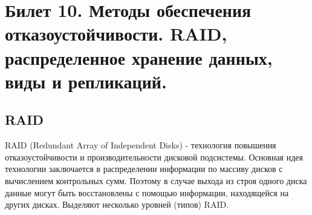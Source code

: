 \newpage
\section {Билет 10. Методы обеспечения отказоустойчивости. RAID, распределенное хранение данных, виды и репликаций.}
\subsection {RAID}
RAID (Redundant Array of Independent Disks) - технология повышения отказоустойчивости и производительности дисковой подсистемы. Основная идея технологии заключается в распределении информации по массиву дисков с вычислением контрольных сумм. Поэтому в случае выхода из строя одного диска данные могут быть восстановлены с помощью информации, находящейся на других дисках. 
Выделяют несколько уровней (типов) RAID.

